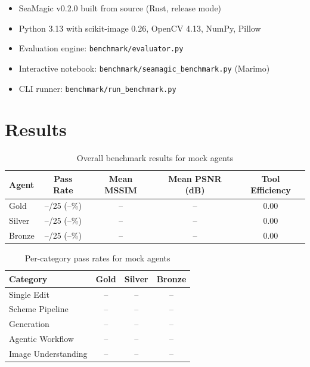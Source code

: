 \documentclass[11pt,a4paper]{article}
\begin{document}
\begin{itemize}
    \item SeaMagic v0.2.0 built from source (Rust, release mode)
    \item Python 3.13 with scikit-image 0.26, OpenCV 4.13, NumPy, Pillow
    \item Evaluation engine: \texttt{benchmark/evaluator.py}
    \item Interactive notebook: \texttt{benchmark/seamagic\_benchmark.py} (Marimo)
    \item CLI runner: \texttt{benchmark/run\_benchmark.py}
\end{itemize}

\section{Results}

\begin{table}[h]
\centering
\caption{Overall benchmark results for mock agents}
\label{tab:results}
\begin{tabular}{lcccc}
\toprule
\textbf{Agent} & \textbf{Pass Rate} & \textbf{Mean MSSIM} & \textbf{Mean PSNR (dB)} & \textbf{Tool Efficiency} \\
\midrule
Gold & --/25 (--\%) & -- & -- & 0.00 \\
Silver & --/25 (--\%) & -- & -- & 0.00 \\
Bronze & --/25 (--\%) & -- & -- & 0.00 \\
\bottomrule
\end{tabular}
\end{table}


\begin{table}[h]
\centering
\caption{Per-category pass rates for mock agents}
\label{tab:categories_results}
\begin{tabular}{lccc}
\toprule
\textbf{Category} & \textbf{Gold} & \textbf{Silver} & \textbf{Bronze} \\
\midrule
Single Edit & -- & -- & -- \\
Scheme Pipeline & -- & -- & -- \\
Generation & -- & -- & -- \\
Agentic Workflow & -- & -- & -- \\
Image Understanding & -- & -- & -- \\
\bottomrule
\end{tabular}
\end{table}
\end{document}
